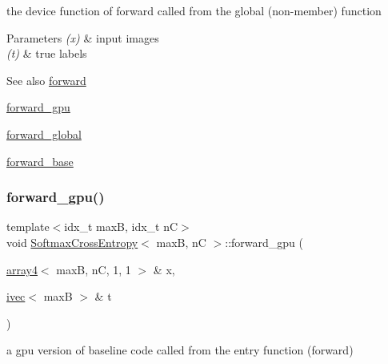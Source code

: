 the device function of forward called from the global (non-\/member) function 


\begin{DoxyParams}{Parameters}
{\em (x)} & input images \\
\hline
{\em (t)} & true labels \\
\hline
\end{DoxyParams}
\begin{DoxySeeAlso}{See also}
\hyperlink{structSoftmaxCrossEntropy_ad9123a2a40bac45237466faf0cff3fbc}{forward} 

\hyperlink{structSoftmaxCrossEntropy_a0e71f6ceb53d769e6b4d7a6d83034669}{forward\+\_\+gpu} 

\hyperlink{softmaxcrossentropy_8h_a578aeeb166bd06e800d9b396eab48b35}{forward\+\_\+global} 

\hyperlink{structSoftmaxCrossEntropy_a8a478a94bbd9fd17e08fe86cb758d90f}{forward\+\_\+base} 
\end{DoxySeeAlso}
\mbox{\label{structSoftmaxCrossEntropy_a0e71f6ceb53d769e6b4d7a6d83034669}} 
\subsubsection{\texorpdfstring{forward\+\_\+gpu()}{forward\_gpu()}}
{\footnotesize\ttfamily template$<$idx\+\_\+t maxB, idx\+\_\+t nC$>$ \\
void \hyperlink{structSoftmaxCrossEntropy}{Softmax\+Cross\+Entropy}$<$ maxB, nC $>$\+::forward\+\_\+gpu (\begin{DoxyParamCaption}\item[{\hyperlink{structarray4}{array4}$<$ maxB, nC, 1, 1 $>$ \&}]{x,  }\item[{\hyperlink{structivec}{ivec}$<$ maxB $>$ \&}]{t }\end{DoxyParamCaption})\hspace{0.3cm}{\ttfamily [inline]}}



a gpu version of baseline code called from the entry function (forward) 


